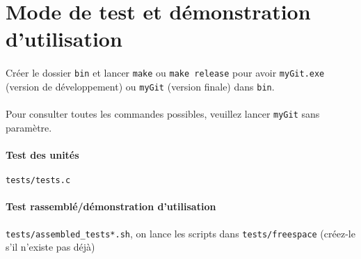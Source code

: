 \documentclass{report}
\begin{document}
\section*{Mode de test et démonstration d'utilisation}

\paragraph{} Créer le dossier \verb|bin| et lancer \verb|make| ou \verb|make release|
pour avoir \verb|myGit.exe| (version de développement) ou \verb|myGit| (version finale) dans \verb|bin|.

\paragraph{} Pour consulter toutes les commandes possibles, veuillez lancer \verb|myGit| sans paramètre.

\paragraph{Test des unités} \verb|tests/tests.c|
\paragraph{Test rassemblé/démonstration d'utilisation}\verb|tests/assembled_tests*.sh|, 
on lance les scripts dans \verb|tests/freespace| (créez-le s'il n'existe pas déjà)
\end{document}
